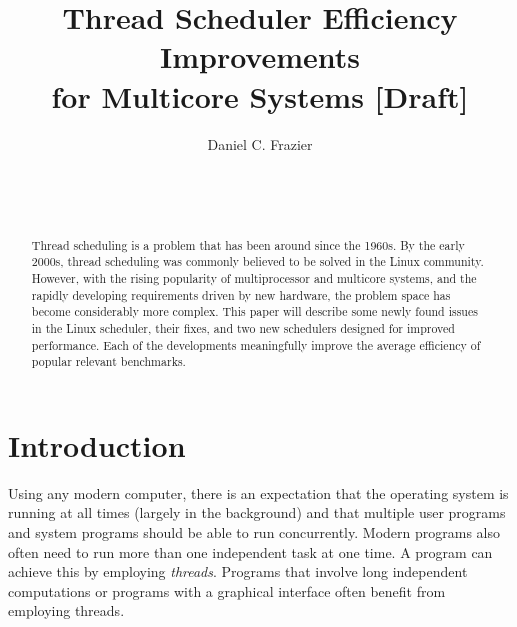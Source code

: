 \documentclass{sig-alternate}
\begin{document}

\title{Thread Scheduler Efficiency Improvements \\ for Multicore Systems [Draft]}


\author{
\alignauthor
Daniel C. Frazier\\
	\\
	\\
	\\
}
\maketitle

\begin{abstract}

Thread scheduling is a problem that has been around since the 1960s. By the early 2000s, thread scheduling was commonly believed to be solved in the Linux community. However, with the rising popularity of multiprocessor and multicore systems, and the rapidly developing requirements driven by new hardware, the problem space has become considerably more complex. This paper will describe some newly found issues in the Linux scheduler, their fixes, and two new schedulers designed for improved performance. Each of the developments meaningfully improve the average efficiency of popular relevant benchmarks.

\end{abstract}


\section{Introduction}
\label{sec:intro}

Using any modern computer, there is an expectation that the operating system is running at all times (largely in the background) and that multiple user programs and system programs should be able to run concurrently. Modern programs also often need to run more than one independent task at one time. A program can achieve this by employing \emph{threads}. Programs that involve long independent computations or programs with a graphical interface often benefit from employing threads.
\end{document}
